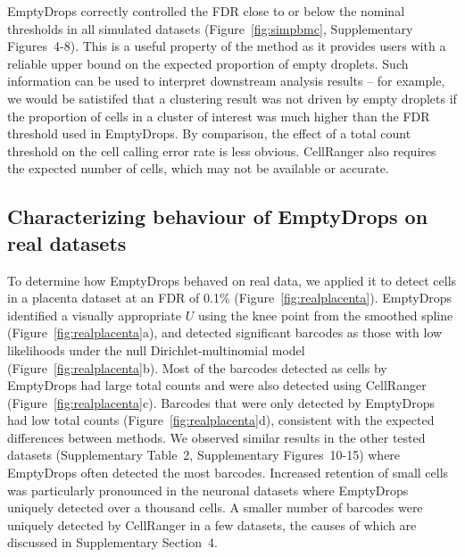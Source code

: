 \documentclass[10pt,letterpaper]{article}
\newcommand{\supptabdataset}{2}
\newcommand{\suppfigsimresults}{4-8}
\newcommand{\suppfigrealresults}{10-15}
\newcommand{\suppsecpower}{4}
\begin{document}
EmptyDrops correctly controlled the FDR close to or below the nominal thresholds in all simulated datasets (Figure~\ref{fig:simpbmc}, Supplementary Figures~\suppfigsimresults{}).
This is a useful property of the method as it provides users with a reliable upper bound on the expected proportion of empty droplets.
Such information can be used to interpret downstream analysis results --
for example, we would be satistifed that a clustering result was not driven by empty droplets if the proportion of cells in a cluster of interest was much higher than the FDR threshold used in EmptyDrops.
By comparison, the effect of a total count threshold on the cell calling error rate is less obvious.
CellRanger also requires the expected number of cells, which may not be available or accurate.

\subsection*{Characterizing behaviour of EmptyDrops on real datasets}
To determine how EmptyDrops behaved on real data, we applied it to detect cells in a placenta dataset \cite{vento2018single} at an FDR of 0.1\% (Figure~\ref{fig:realplacenta}).
EmptyDrops identified a visually appropriate $U$ using the knee point from the smoothed spline (Figure~\ref{fig:realplacenta}a),
and detected significant barcodes as those with low likelihoods under the null Dirichlet-multinomial model (Figure~\ref{fig:realplacenta}b).
Most of the barcodes detected as cells by EmptyDrops had large total counts and were also detected using CellRanger (Figure~\ref{fig:realplacenta}c). 
Barcodes that were only detected by EmptyDrops had low total counts (Figure~\ref{fig:realplacenta}d), consistent with the expected differences between methods.
We observed similar results in the other tested datasets (Supplementary Table~\supptabdataset{}, Supplementary Figures~\suppfigrealresults{})
where EmptyDrops often detected the most barcodes.
Increased retention of small cells was particularly pronounced in the neuronal datasets where EmptyDrops uniquely detected over a thousand cells.
A smaller number of barcodes were uniquely detected by CellRanger in a few datasets, the causes of which are discussed in Supplementary Section~\suppsecpower{}.
\end{document}
